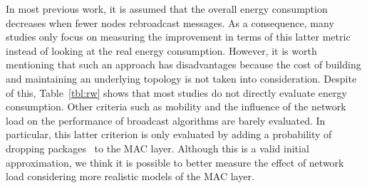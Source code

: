 In most previous work, it is assumed that the overall energy consumption decreases when fewer nodes rebroadcast messages.
As a consequence, many studies only focus on measuring the improvement in terms of this latter metric instead of looking at the real energy consumption.
However, it is worth mentioning that such an approach has disadvantages because
the cost of building and maintaining an underlying topology is not taken into consideration.
Despite of this, Table~\ref{tbl:rw} shows that most studies do not directly evaluate energy consumption.
Other criteria such as mobility and the influence of the network load on the performance of broadcast algorithms are barely evaluated.
In particular, this latter criterion is only evaluated by adding a probability of dropping packages~\cite{Ni:1999:BSP:313451.313525, Qayyum2002} to the MAC layer.
Although this is a valid initial approximation, we think it is possible to better measure the effect of network load considering more realistic models of the MAC layer.

